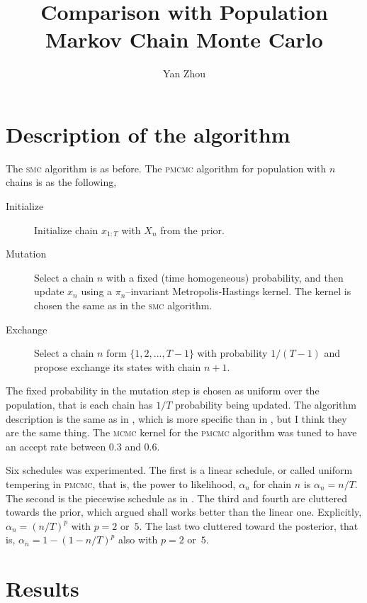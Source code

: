 \documentclass[11pt, bib, fontset = Minion]{marticle}
\def\mcmc{\textsc{mcmc}\xspace}
\def\pmcmc{\textsc{pmcmc}\xspace}
\def\smc{\textsc{smc}\xspace}
\begin{document}
  \title{Comparison with Population Markov Chain Monte Carlo}
  \author{Yan Zhou}
  \maketitle

  \section{Description of the algorithm}
  \label{sec:Description of the algorithm}

  The \smc algorithm is as before. The \pmcmc algorithm for population with
  $n$ chains is as the following,

  \begin{description}
    \item[Initialize] Initialize chain $x_{1:T}$ with $X_n$ from the prior.
    \item[Mutation] Select a chain $n$ with a fixed (time homogeneous)
      probability, and then update $x_n$ using a $\pi_n$--invariant
      Metropolis-Hastings kernel. The kernel is chosen the same as in the \smc
      algorithm.
    \item[Exchange] Select a chain $n$ form $\{1,2,\dots,T-1\}$ with
      probability $1/(T-1)$ and propose exchange its states with chain $n+1$.
  \end{description}

  The fixed probability in the mutation step is chosen as uniform over the
  population, that is each chain has $1/T$ probability being updated. The
  algorithm description is the same as in \textcite{Jasra:2007in}, which is
  more specific than in \textcite{Calderhead:2009bd}, but I think they are the
  same thing. The \mcmc kernel for the \pmcmc algorithm was tuned to have an
  accept rate between 0.3 and 0.6.

  Six schedules was experimented. The first is a linear schedule, or called
  uniform tempering in \pmcmc, that is, the power to likelihood, $\alpha_n$
  for chain $n$ is $\alpha_n = n/T$.  The second is the piecewise schedule as
  in \textcite{DelMoral:2006hc}.  The third and fourth are cluttered towards
  the prior, which \textcite{Calderhead:2009bd} argued shall works better than
  the linear one.  Explicitly, $\alpha_n = (n/T)^p$ with $p = 2$ or~$5$. The
  last two cluttered toward the posterior, that is, $\alpha_n = 1 - (1 -
  n/T)^p$ also with $p = 2$ or~$5$.

  \section{Results}
  \label{sec:Results}
\end{document}
